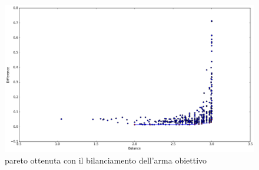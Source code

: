 \documentclass[12pt, italian]{toptesi}
\begin{document}
\begin{figure}[htp]
\centering
\includegraphics[width=1.0\textwidth]{pareto_single_weap}
\caption{pareto ottenuta con il bilanciamento dell'arma obiettivo}
\label{fig:pareto_single_weap}
\end{figure}
\end{document}
